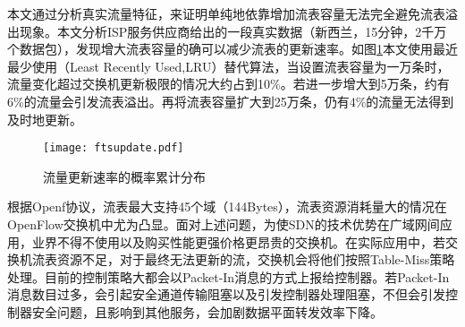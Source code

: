 
本文通过分析真实流量特征，来证明单纯地依靠增加流表容量无法完全避免流表溢出现象。本文分析ISP服务供应商给出的一段真实数据（新西兰，15分钟，2千万个数据包），发现增大流表容量的确可以减少流表的更新速率。如图\ref{fig:ftsupdate}本文使用最近最少使用（Least Recently Used,LRU）替代算法，当设置流表容量为一万条时，流量变化超过交换机更新极限的情况大约占到10\%。若进一步增大到5万条，约有6\%的流量会引发流表溢出。再将流表容量扩大到25万条，仍有4\%的流量无法得到及时地更新。

\begin{figure}[!ht]
	\centering 
	\texttt{[image: ftsupdate.pdf]}
	\caption{流量更新速率的概率累计分布} \label{fig:ftsupdate}
\end{figure}

根据Openf协议，流表最大支持45个域（144Bytes），流表资源消耗量大的情况在OpenFlow交换机中尤为凸显。面对上述问题，为使SDN的技术优势在广域网间应用，业界不得不使用以及购买性能更强价格更昂贵的交换机。在实际应用中，若交换机流表资源不足，对于最终无法更新的流，交换机会将他们按照Table-Miss策略处理。目前的控制策略大都会以Packet-In消息的方式上报给控制器。若Packet-In消息数目过多，会引起安全通道传输阻塞以及引发控制器处理阻塞，不但会引发控制器安全问题，且影响到其他服务，会加剧数据平面转发效率下降。











